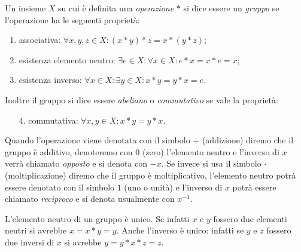 \begin{definition}[gruppo]
  Un insieme $X$ su cui è definita una \emph{operazione} $*$ 
  si dice essere un \emph{gruppo}%
%
 se l'operazione
  ha le seguenti proprietà:
  \begin{enumerate}
    \item associativa: $\forall x,y,z\in X\colon (x*y)*z = x*(y*z)$;
    \item esistenza elemento neutro: 
    $\exists e\in X\colon \forall x\in X \colon e*x=x*e = x$;
    \item esistenza inverso: 
    $\forall x\in X\colon \exists y\in X\colon x*y=y*x=e$.
  \end{enumerate}
  Inoltre il gruppo si dice essere \emph{abeliano}%
%
 o \emph{commutativo}
  se vale la proprietà:
  \begin{enumerate}
    \item[4.] commutativa: $\forall x,y\in X\colon x*y = y*x$.
  \end{enumerate}
  
  Quando l'operazione viene denotata con il simbolo $+$ (addizione)
  diremo che il gruppo è additivo, denoteremo con $0$ 
  (zero) l'elemento neutro e l'inverso di $x$ verrà chiamato \emph{opposto}
  e si denota con $-x$.
  Se invece si usa il simbolo $\cdot$ (moltiplicazione)
  diremo che il gruppo è moltiplicativo, l'elemento neutro potrà 
  essere denotato con il simbolo $1$ (uno o unità) e 
  l'inverso di $x$ potrà essere chiamato \emph{reciproco}
  e si denota usualmente con $x^{-1}$.
  \end{definition}
  
  L'elemento neutro di un gruppo è unico. 
  Se infatti $x$ e $y$ fossero due elementi neutri 
  si avrebbe $x = x*y = y$. 
  Anche l'inverso è unico: infatti se $y$ e $z$ fossero 
  due inversi di $x$ si avrebbe $y = y * x * z = z$.
  
